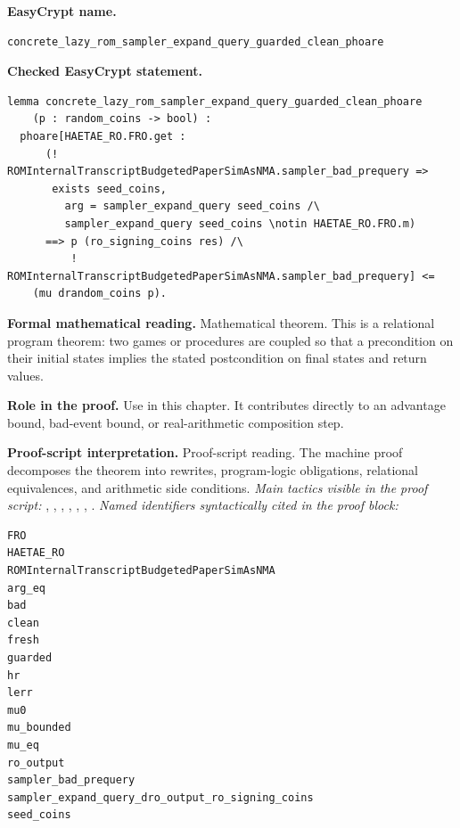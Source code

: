 \begin{formaltheorem}
\noindent\textbf{EasyCrypt name.}
\begin{lstlisting}[language=EasyCrypt,basicstyle=\ttfamily\scriptsize]
concrete_lazy_rom_sampler_expand_query_guarded_clean_phoare
\end{lstlisting}
\noindent\textbf{Checked EasyCrypt statement.}
\begin{lstlisting}[language=EasyCrypt,basicstyle=\ttfamily\scriptsize]
lemma concrete_lazy_rom_sampler_expand_query_guarded_clean_phoare
    (p : random_coins -> bool) :
  phoare[HAETAE_RO.FRO.get :
      (! ROMInternalTranscriptBudgetedPaperSimAsNMA.sampler_bad_prequery =>
       exists seed_coins,
         arg = sampler_expand_query seed_coins /\
         sampler_expand_query seed_coins \notin HAETAE_RO.FRO.m)
      ==> p (ro_signing_coins res) /\
          ! ROMInternalTranscriptBudgetedPaperSimAsNMA.sampler_bad_prequery] <=
    (mu drandom_coins p).
\end{lstlisting}
\noindent\textbf{Formal mathematical reading.}
Mathematical theorem. This is a relational program theorem: two games or procedures are coupled so that a precondition on their initial states implies the stated postcondition on final states and return values.

\noindent\textbf{Role in the proof.}
Use in this chapter. It contributes directly to an advantage bound, bad-event bound, or real-arithmetic composition step.

\noindent\textbf{Proof-script interpretation.}
Proof-script reading. The machine proof decomposes the theorem into rewrites, program-logic obligations, relational equivalences, and arithmetic side conditions.
\emph{Main tactics visible in the proof script:} , , , , , , .
\emph{Named identifiers syntactically cited in the proof block:}
\begin{lstlisting}[language=EasyCrypt,basicstyle=\ttfamily\scriptsize]
FRO
HAETAE_RO
ROMInternalTranscriptBudgetedPaperSimAsNMA
arg_eq
bad
clean
fresh
guarded
hr
lerr
mu0
mu_bounded
mu_eq
ro_output
sampler_bad_prequery
sampler_expand_query_dro_output_ro_signing_coins
seed_coins
\end{lstlisting}

\end{formaltheorem}

